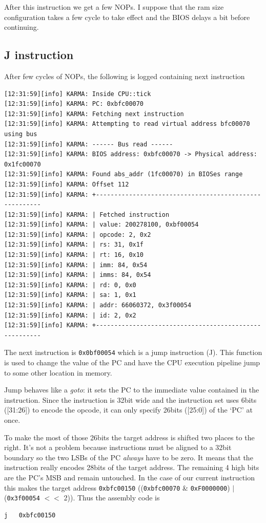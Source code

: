 \documentclass[a4paper]{article}
\newcommand{\code}[1] {\texttt{#1}}
\begin{document}
After this instruction we get a few NOPs. I suppose that the ram size
configuration takes a few cycle to take effect and the BIOS delays a
bit before continuing.

\subsection{J instruction}
After few cycles of NOPs, the following is logged containing next
instruction

\begin{verbatim}
[12:31:59][info] KARMA: Inside CPU::tick
[12:31:59][info] KARMA: PC: 0xbfc00070
[12:31:59][info] KARMA: Fetching next instruction
[12:31:59][info] KARMA: Attempting to read virtual address bfc00070 using bus
[12:31:59][info] KARMA: ------ Bus read ------
[12:31:59][info] KARMA: BIOS address: 0xbfc00070 -> Physical address: 0x1fc00070
[12:31:59][info] KARMA: Found abs_addr (1fc00070) in BIOSes range
[12:31:59][info] KARMA: Offset 112
[12:31:59][info] KARMA: +-------------------------------------------------------
[12:31:59][info] KARMA: | Fetched instruction 
[12:31:59][info] KARMA: | value: 200278100, 0xbf00054
[12:31:59][info] KARMA: | opcode: 2, 0x2
[12:31:59][info] KARMA: | rs: 31, 0x1f
[12:31:59][info] KARMA: | rt: 16, 0x10
[12:31:59][info] KARMA: | imm: 84, 0x54
[12:31:59][info] KARMA: | imms: 84, 0x54
[12:31:59][info] KARMA: | rd: 0, 0x0
[12:31:59][info] KARMA: | sa: 1, 0x1
[12:31:59][info] KARMA: | addr: 66060372, 0x3f00054
[12:31:59][info] KARMA: | id: 2, 0x2
[12:31:59][info] KARMA: +-------------------------------------------------------
\end{verbatim}

The next instruction is \code{0x0bf00054} which is a jump
instruction (J). This function is used to change the value of the PC
and have the CPU execution pipeline jump to some other location in
memory.

Jump behaves like a \emph{goto}: it sets the PC to the immediate value
contained in the instruction. Since the instruction is 32bit wide and
the instruction set uses 6bits ([31:26]) to encode the opcode, it can only
specify 26bits ([25:0]) of the `PC' at once.

To make the most of those 26bits the target address is shifted two
places to the right. It's not a problem because instructions must be
aligned to a 32bit boundary so the two LSBs of the PC \emph{always}
have to be zero. It means that the instruction really encodes 28bits
of the target address. The remaining 4 high bits are the PC's MSB and
remain untouched. In the case of our current instruction this makes
the target address \code{0xbfc00150} ((\code{0xbfc00070} \& \code{0xF0000000}) $|$
(\code{0x3f00054} $<<$ 2)).  Thus the assembly code is
\begin{lstlisting}[language=assembly]
j   0xbfc00150
\end{lstlisting}
\end{document}

